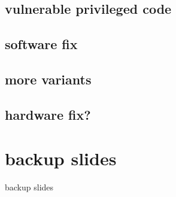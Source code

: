 \subsection{vulnerable privileged code}

\subsection{software fix}

\subsection{more variants}

\subsection{hardware fix?}

\section{backup slides}
\begin{frame}{backup slides}
\end{frame}


